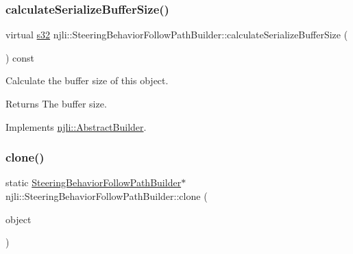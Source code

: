 \mbox{\label{classnjli_1_1_steering_behavior_follow_path_builder_aba61cd2c8445bf764783323c4e1fa424}} 
\subsubsection{\texorpdfstring{calculate\+Serialize\+Buffer\+Size()}{calculateSerializeBufferSize()}}
{\footnotesize\ttfamily virtual \mbox{\hyperlink{_util_8h_aa62c75d314a0d1f37f79c4b73b2292e2}{s32}} njli\+::\+Steering\+Behavior\+Follow\+Path\+Builder\+::calculate\+Serialize\+Buffer\+Size (\begin{DoxyParamCaption}{ }\end{DoxyParamCaption}) const\hspace{0.3cm}{\ttfamily [virtual]}}

Calculate the buffer size of this object.

\begin{DoxyReturn}{Returns}
The buffer size. 
\end{DoxyReturn}


Implements \mbox{\hyperlink{classnjli_1_1_abstract_builder_aa1d220053e182c37b31b427499c6eacf}{njli\+::\+Abstract\+Builder}}.

\mbox{\label{classnjli_1_1_steering_behavior_follow_path_builder_ad485a7eec809a2401a05e4d8a69ee756}} 
\subsubsection{\texorpdfstring{clone()}{clone()}}
{\footnotesize\ttfamily static \mbox{\hyperlink{classnjli_1_1_steering_behavior_follow_path_builder}{Steering\+Behavior\+Follow\+Path\+Builder}}$\ast$ njli\+::\+Steering\+Behavior\+Follow\+Path\+Builder\+::clone (\begin{DoxyParamCaption}\item[{const \mbox{\hyperlink{classnjli_1_1_steering_behavior_follow_path_builder}{Steering\+Behavior\+Follow\+Path\+Builder}} \&}]{object }\end{DoxyParamCaption})\hspace{0.3cm}{\ttfamily [static]}}

